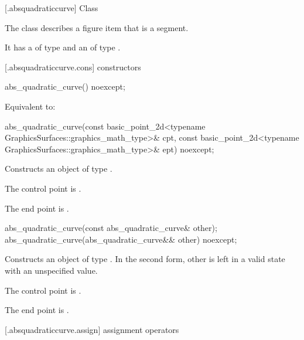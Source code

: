 [\iotwod.absquadraticcurve] {Class }

\pnum
{}%
The class  describes a figure item that is a segment.

\pnum
It has a  of type  and an  of type .

 [\iotwod.absquadraticcurve.cons] { constructors}

%
\begin{itemdecl}
abs_quadratic_curve() noexcept;
\end{itemdecl}
\begin{itemdescr}
\pnum
\effects
Equivalent to: 
\end{itemdescr}

%
\begin{itemdecl}
abs_quadratic_curve(const basic_point_2d<typename GraphicsSurfaces::graphics_math_type>& cpt,
  const basic_point_2d<typename GraphicsSurfaces::graphics_math_type>& ept) noexcept;
\end{itemdecl}
\begin{itemdescr}
\pnum
\effects
Constructs an object of type .

\pnum
The control point is .

\pnum
The end point is .
\end{itemdescr}

%
\begin{itemdecl}
abs_quadratic_curve(const abs_quadratic_curve& other);
abs_quadratic_curve(abs_quadratic_curve&& other) noexcept;
\end{itemdecl}
\begin{itemdescr}
\pnum
\effects
Constructs an object of type . In the second form, other is left in a valid state with an unspecified value.

\pnum
The control point is .

\pnum
The end point is .
\end{itemdescr}

 [\iotwod.absquadraticcurve.assign] { assignment operators}

